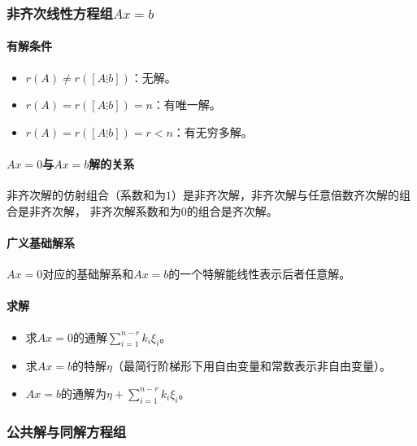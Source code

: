 \documentclass[
12pt, %
a4paper, 
oneside, %
headinclude,footinclude, %
]{scrartcl}
\begin{document}
\subsubsection{非齐次线性方程组$ Ax = b $}
\paragraph{有解条件}
\begin{itemize}
\item $ r(A) \neq r([A \vdots b]) $：无解。
\item $ r(A) = r([A \vdots b]) = n $：有唯一解。
\item $ r(A) = r([A \vdots b]) = r < n $：有无穷多解。
\end{itemize}
\paragraph{$ Ax = 0 $与$ Ax = b $解的关系}
非齐次解的仿射组合（系数和为$ 1 $）是非齐次解，非齐次解与任意倍数齐次解的组合是非齐次解，
非齐次解系数和为$ 0 $的组合是齐次解。
\paragraph{广义基础解系}
$ Ax = 0 $对应的基础解系和$ Ax = b $的一个特解能线性表示后者任意解。
\paragraph{求解}
\begin{itemize}
\item 求$ Ax = 0 $的通解$ \sum_{i = 1}^{n - r} k_i \xi_i $。
\item 求$ Ax = b $的特解$ \eta $（最简行阶梯形下用自由变量和常数表示非自由变量）。
\item $ Ax = b $的通解为$ \eta + \sum_{i = 1}^{n - r} k_i \xi_i $。
\end{itemize}
\subsubsection{公共解与同解方程组}
\end{document}
